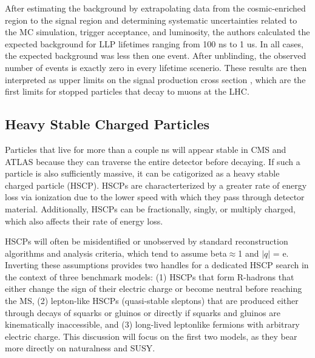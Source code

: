 \documentclass[12pt]{article}
\begin{document}
    After estimating the background by extrapolating data from the cosmic-enriched region to the signal region and determining systematic uncertainties related to the MC simulation, trigger acceptance, and luminosity, the authors calculated the expected background for LLP lifetimes ranging from 100 ns to 1 us. In all cases, the expected background was less then one event. After unblinding, the observed number of events is exactly zero in every lifetime scenerio. These results are then interpreted as upper limits on the signal production cross section , which are the first limits for stopped particles that decay to muons at the LHC.

\subsection{Heavy Stable Charged Particles}
    Particles that live for more than a couple ns  will appear stable in CMS and ATLAS because they can traverse the entire detector before decaying. If such a particle is also sufficiently massive, it can be catigorized as a heavy stable charged particle (HSCP). HSCPs are characterterized by a greater rate of energy loss via ionization due to the lower speed with which they pass through detector material. Additionally, HSCPs can be fractionally, singly, or multiply charged, which also affects their rate of energy loss. 

    HSCPs will often be misidentified or unobserved by standard reconstruction algorithms and analysis criteria, which tend to assume beta$\approx$1 and $|q|$ = e. Inverting these assumptions provides two handles for a dedicated HSCP search in the context of three benchmark models: (1) HSCPs that form R-hadrons that either change the sign of their electric charge or become neutral before reaching the MS, (2) lepton-like HSCPs (quasi-stable sleptons) that are produced either through decays of squarks or gluinos or directly if squarks and gluinos are kinematically inaccessible, and (3) long-lived leptonlike fermions with arbitrary electric charge. This discussion will focus on the first two models, as they bear more directly on naturalness and SUSY.

     
\end{document}
